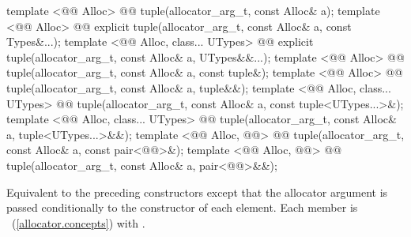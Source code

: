 \documentclass[american,twoside]{book}
\begin{document}
\begin{itemdecl}
template <@@ Alloc>
  @@ 
  tuple(allocator_arg_t, const Alloc& a);
template <@@ Alloc>
  @@ 
  explicit tuple(allocator_arg_t, const Alloc& a, const Types&...);
template <@@ Alloc, class... UTypes>
  @@
  explicit tuple(allocator_arg_t, const Alloc& a, UTypes&&...);
template <@@ Alloc>
  @@ 
  tuple(allocator_arg_t, const Alloc& a, const tuple&);
template <@@ Alloc>
  @@ 
  tuple(allocator_arg_t, const Alloc& a, tuple&&);
template <@@ Alloc, class... UTypes>
  @@
  tuple(allocator_arg_t, const Alloc& a, const tuple<UTypes...>&);
template <@@ Alloc, class... UTypes>
  @@
  tuple(allocator_arg_t, const Alloc& a, tuple<UTypes...>&&);
template <@@ Alloc, @@>
  @@
  tuple(allocator_arg_t, const Alloc& a, const pair<@@>&);
template <@@ Alloc, @@>
  @@
  tuple(allocator_arg_t, const Alloc& a, pair<@@>&&);
\end{itemdecl}

\begin{itemdescr}
\pnum
{}

\pnum
\mbox{\effects} Equivalent to the preceding constructors except that the allocator argument is passed conditionally to the constructor of each element. Each member is \mbox{}~(\mbox{\ref{allocator.concepts}}) with \mbox{}.
\end{itemdescr}
\end{document}
